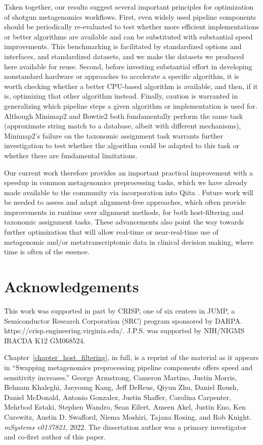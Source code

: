 Taken together, our results suggest several important principles for optimization of shotgun metagenomics workflows. First, even widely used pipeline components should be periodically re-evaluated to test whether more efficient implementations or better algorithms are available and can be substituted with substantial speed improvements. This benchmarking is facilitated by standardized options and interfaces, and standardized datasets, and we make the datasets we produced here available for reuse. Second, before investing substantial effort in developing nonstandard hardware or approaches to accelerate a specific algorithm, it is worth checking whether a better CPU-based algorithm is available, and then, if it is, optimizing that other algorithm instead. Finally, caution is warranted in generalizing which pipeline steps a given algorithm or implementation is used for. Although Minimap2 and Bowtie2 both fundamentally perform the same task (approximate string match to a database, albeit with different mechanisms), Minimap2’s failure on the taxonomic assignment task warrants further investigation to test whether the algorithm could be adapted to this task or whether there are fundamental limitations.


Our current work therefore provides an important practical improvement with a speedup in common metagenomics preprocessing tasks, which we have already made available to the community via incorporation into Qiita \cite{Gonzalez2018-ez}. Future work will be needed to assess and adapt alignment-free approaches, which often provide improvements in runtime over alignment methods, for both host-filtering and taxonomic assignment tasks. These advancements also point the way towards further optimization that will allow real-time or near-real-time use of metagenomic and/or metatranscriptomic data in clinical decision making, where time is often of the essence.

\section{Acknowledgements}
This work was supported in part by CRISP, one of six centers in JUMP, a Semiconductor Research Corporation (SRC) program sponsored by DARPA. \\ https://crisp.engineering.virginia.edu/. J.P.S. was supported by NIH/NIGMS IRACDA K12 GM068524.

Chapter~\ref{chapter_host_filtering}, in full, is a reprint of the material as it appears in ``Swapping metagenomics preprocessing pipeline components offers speed and sensitivity increases.'' George Armstrong, Cameron Martino, Justin Morris, Behnam Khaleghi, Jaeyoung Kang, Jeff DeReus, Qiyun Zhu, Daniel Roush, Daniel McDonald, Antonio Gonzalez, Justin Shaffer, Carolina Carpenter, Mehrbod Estaki, Stephen Wandro, Sean Eilert, Ameen Akel, Justin Eno, Ken Curewitz, Austin D. Swafford, Niema Moshiri, Tajana Rosing, and Rob Knight. \textit{mSystems e0137821}, 2022. The dissertation author was a primary investigator and co-first author of this paper.
